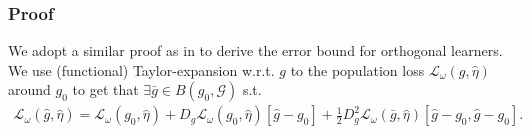 \documentclass{article}
\theoremstyle{plain}
\theoremstyle{definition}
\theoremstyle{remark}
\newcommand{\1}{\mathds{1}}                %
\begin{document}
\subsubsection{Proof}
We adopt a similar proof as in \cite{Foster.2023, Morzywolek.2023} to derive the error bound for orthogonal learners. We use (functional) Taylor-expansion w.r.t. $g$ to the population loss $\mathcal{L}_\omega(g, \hat\eta)$ around $g_0$ to get that $\exists \bar{g} \in B(g_0, \mathcal{G})$ s.t.
\begin{align}
\label{taylor-exp}
     \mathcal{L}_\omega(\hat{g}, \hat{\eta}) = \mathcal{L}_\omega(g_0, \hat{\eta}) + D_g\mathcal{L}_\omega(g_0, \hat{\eta})[\hat{g} - g_0] + \frac{1}{2} D_g^2 \mathcal{L}_\omega(\bar{g}, \hat{\eta})[\hat{g} - g_0, \hat{g} - g_0].
\end{align}
\end{document}
